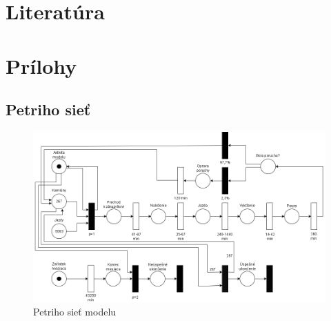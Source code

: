 \documentclass[a4paper, 11pt]{article}
\begin{document}
 
    \newpage
	\section{Literatúra}
	
    \renewcommand{\refname}{}
	

    \clearpage
	\appendix
	\section{Prílohy}
    \subsection{Petriho sieť}
	\label{subsection:petrinet}
	\begin{figure}[!ht]
		\centering
		\vspace{1cm}
		\includegraphics[width=0.95\linewidth]{resources/petri_net.png}
		\caption{Petriho sieť modelu}
		\label{figure:petri_net}
	\end{figure}
\end{document}
